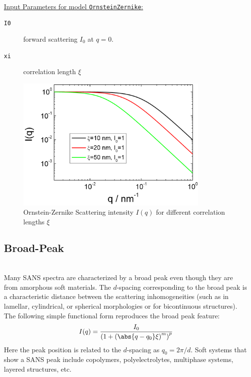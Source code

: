 \hspace{1pt}\\
\underline{Input Parameters for model \texttt{OrnsteinZernike}:}\\
\begin{description}
\item[\texttt{I0}] forward scattering $I_0$ at $q=0$.
\item[\texttt{xi}] correlation length $\xi$
\end{description}

\begin{figure}[htb]
\begin{center}
\includegraphics[width=0.85\textwidth,height=0.6\textwidth]{OrnsteinZernicke.png}
\end{center}
\caption{Ornstein-Zernike Scattering intensity $I(q)$ for different
correlation lengths $\xi$} \label{fig:OrnsteinZernicke}
\end{figure}
\clearpage

\subsection{Broad-Peak}
\label{sect:BroadPeak}
 ~\\
Many SANS spectra are characterized by a broad peak even though they
are from amorphous soft materials. The $d$-spacing corresponding to
the broad peak is a characteristic distance between the scattering
inhomogeneities (such as in lamellar, cylindrical, or spherical
morphologies or for bicontinuous structures). The following simple
functional form reproduces the broad peak feature:
\begin{align}
I(q) = \frac{I_0}{\left(1+\left(\abs{q-q_0}\xi\right)^m\right)^p}
\end{align}
Here the peak position is related to the $d$-spacing as $q_0 =
2\pi/d$. Soft systems that show a SANS peak include copolymers,
polyelectrolytes, multiphase systems, layered structures, etc.


